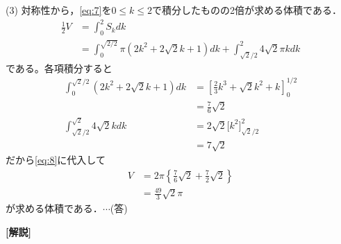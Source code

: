 \documentclass[a4paper,10pt]{ltjsarticle}
\begin{document}
\begin{multicols}{2}
  \vspace{10pt}
  (3)
  対称性から，\cref{eq:7}を$0\le k \le 2$で積分したものの2倍が求める体積である．
  \begin{align}
    \frac{1}{2}V
     & = \int_0^2 S_k dk                                                                                       \nonumber \\
     & = \int_0^{\sqrt{2/2}} \pi (2k^2+2\sqrt{2}k+1)dk + \int_{\sqrt{2}/2}^{2} 4\sqrt{2}\pi k dk \label{eq:8}
  \end{align}
  である。各項積分すると
  \begin{align*}
    \int_0^{\sqrt{2}/2} (2k^2+2\sqrt{2}k+1)dk
     & = \left[ \frac{2}{3}k^3+\sqrt{2}k^2 + k \right]_0^{1/2} \\
     & = \frac{7}{6}\sqrt{2}                                   \\
    \int_{\sqrt{2}/2}^{\sqrt{2}} 4\sqrt{2}kdk
     & = 2\sqrt{2}\biggr [k^2\biggr ]_{\sqrt{2}/2}^{2}         \\
     & = 7\sqrt{2}
  \end{align*}
  だから\cref{eq:8}に代入して
  \begin{align*}
    V
     & = 2\pi \left\{ \frac{7}{6}\sqrt{2} + \frac{7}{2}\sqrt{2} \right\} \\
     & = \frac{49}{3}\sqrt{2}\pi
  \end{align*}
  が求める体積である．$\cdots$(答)

  \vspace{10pt}
  {\bf[解説]}

  \newpage
\end{multicols}
\end{document}
